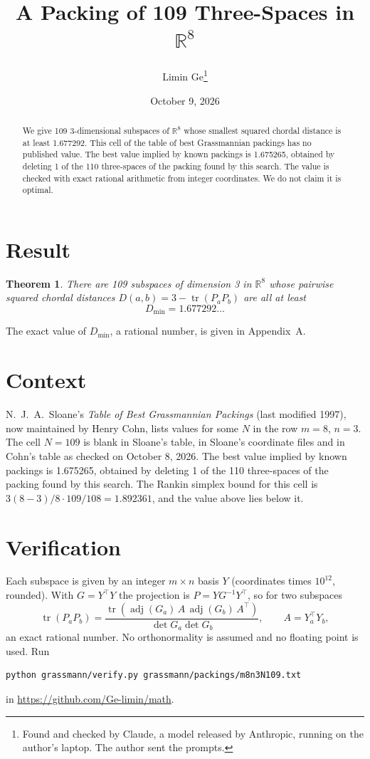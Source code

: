 \documentclass[11pt,a4paper]{article}
\title{A Packing of 109 Three-Spaces in $\mathbb{R}^{8}$}
\author{Limin Ge\thanks{Found and checked by Claude, a model released by Anthropic, running on the author's laptop. The author sent the prompts.}}
\date{October 9, 2026}
\newtheorem*{theorem}{Theorem}
\begin{document}
\maketitle
\begin{abstract}
We give 109 3-dimensional subspaces of $\mathbb{R}^{8}$ whose smallest squared chordal distance is at least 1.677292. This cell of the table of best Grassmannian packings has no published value. The best value implied by known packings is 1.675265, obtained by deleting 1 of the 110 three-spaces of the packing found by this search. The value is checked with exact rational arithmetic from integer coordinates. We do not claim it is optimal.
\end{abstract}

\section{Result}
\begin{theorem}
There are 109 subspaces of dimension 3 in $\mathbb{R}^{8}$ whose pairwise squared chordal distances $D(a,b) = 3 - \operatorname{tr}(P_aP_b)$ are all at least
\[ D_{\min} = 1.677292\ldots \]
\end{theorem}
The exact value of $D_{\min}$, a rational number, is given in Appendix~A.


\section{Context}
N.~J.~A.~Sloane's \emph{Table of Best Grassmannian Packings} (last modified 1997), now maintained by Henry Cohn, lists values for some $N$ in the row $m=8$, $n=3$. The cell $N=109$ is blank in Sloane's table, in Sloane's coordinate files and in Cohn's table as checked on October 8, 2026. The best value implied by known packings is 1.675265, obtained by deleting 1 of the 110 three-spaces of the packing found by this search. The Rankin simplex bound for this cell is $3(8-3)/8\cdot 109/108 = 1.892361$, and the value above lies below it.


\section{Verification}
Each subspace is given by an integer $m\times n$ basis $Y$ (coordinates times $10^{12}$, rounded). With $G=Y^\top Y$ the projection is $P=YG^{-1}Y^\top$, so for two subspaces
\[ \operatorname{tr}(P_aP_b)=\frac{\operatorname{tr}(\operatorname{adj}(G_a)\,A\,\operatorname{adj}(G_b)\,A^\top)}{\det G_a\det G_b},\qquad A=Y_a^\top Y_b, \]
an exact rational number. No orthonormality is assumed and no floating point is used. Run
\begin{verbatim}
python grassmann/verify.py grassmann/packings/m8n3N109.txt
\end{verbatim}
in \url{https://github.com/Ge-limin/math}.
\end{document}
